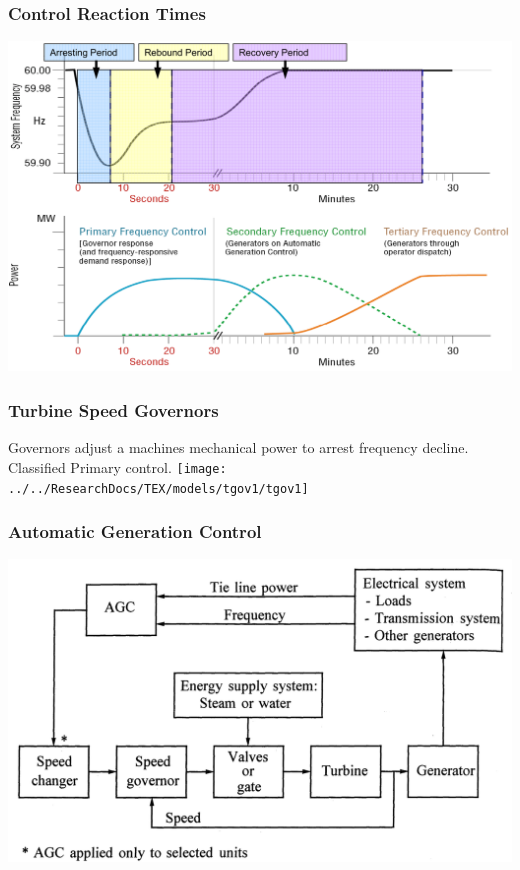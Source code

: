 \documentclass[14pt, unknownkeysallowed]{beamer}
\begin{document}
\begin{frame}
\frametitle{Control Reaction Times}
\begin{center}
\includegraphics[height=.85\textheight]{ctrlReaction} %
\end{center}
\end{frame}
\begin{frame}
\frametitle{Turbine Speed Governors}
Governors adjust a machines mechanical power to arrest frequency decline. Classified Primary control.
{\centering\texttt{[image: ../../ResearchDocs/TEX/models/tgov1/tgov1]}}
\end{frame}
\begin{frame}
\frametitle{Automatic Generation Control}
{\centering\includegraphics[height=.8\textheight]{AGCblockdiagram}}
{\footnotesize\cite{Kundur}}
\end{frame}
\end{document}
